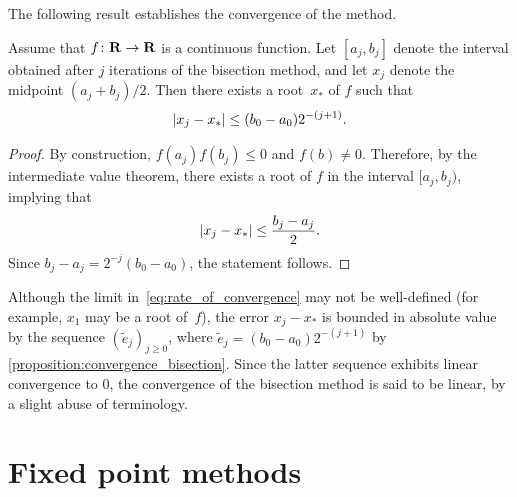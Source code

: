 The following result establishes the convergence of the method.
\begin{proposition}
    \label{proposition:convergence_bisection}
    Assume that $f\colon \mathbf R \to \mathbf R$ is a continuous function.
    Let $[a_j, b_j]$ denote the interval obtained after $j$ iterations of the bisection method,
    and let $x_j$ denote the midpoint $(a_j + b_j)/2$.
    Then there exists a root~$x_*$ of $f$ such that
    \begin{equation}
        \label{eq:error_bisection}
        \lvert x_j - x_*\rvert \leq (b_0 - a_0) 2^{-(j+1)}.
    \end{equation}
\end{proposition}
\begin{proof}
    By construction, $f(a_j) f(b_j) \leq 0$ and $f(b) \neq 0$.
    Therefore, by the intermediate value theorem,
    there exists a root of $f$ in the interval $[a_j, b_j)$,
    implying that
    \[
        \lvert x_j - x_*\rvert \leq \frac{b_j - a_j}{2}.
    \]
    Since $b_j - a_j = 2^{-j} (b_0 - a_0)$,
    the statement follows.
\end{proof}
Although the limit in~\eqref{eq:rate_of_convergence} may not be well-defined (for example, $x_1$ may be a root of~$f$),
the error $x_j - x_*$ is bounded in absolute value by the sequence $(\widetilde e_j)_{j \geq 0}$,
where $\widetilde e_j = (b_0 - a_0) 2^{-(j+1)}$ by \cref{proposition:convergence_bisection}.
Since the latter sequence exhibits linear convergence to 0,
the convergence of the bisection method is said to be linear,
by a slight abuse of terminology.


\section{Fixed point methods}
\label{sec:fixed_point_methods}

